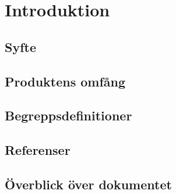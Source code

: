 \section{Introduktion}

\subsection{Syfte}

\subsection{Produktens omfång}

\subsection{Begreppsdefinitioner}

\subsection{Referenser}

\subsection{Överblick över dokumentet}
